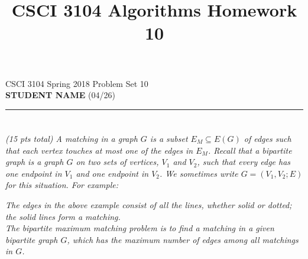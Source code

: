 \documentclass[12pt]{article} \setlength{\oddsidemargin}{0in}
\title{CSCI 3104 Algorithms Homework 10}
\begin{document}
\noindent CSCI 3104 Spring 2018 \hfill Problem Set 10\\
\textbf{STUDENT NAME} (04/26)\\
\noindent\rule{\linewidth}{0.5pt}

\section{}
\textit{(15 pts total) A matching in a graph $G$ is a subset $E_M \subseteq E(G)$ of edges such that each vertex touches at most one of the edges in $E_M$. Recall that a bipartite graph is a graph $G$ on two sets of vertices, $V_1$ and $V_2$, such that every edge has one endpoint in $V_1$ and one endpoint in $V_2$. We sometimes write $G = (V_1, V_2; E)$ for this situation. For example:}

\begin{table}[H]
\centering
{}
\end{table}

\textit{The edges in the above example consist of all the lines, whether solid or dotted; the solid lines form a matching.\\
The bipartite maximum matching problem is to find a matching in a given bipartite graph $G$, which has the maximum number of edges among all matchings in $G$.}
\end{document}
